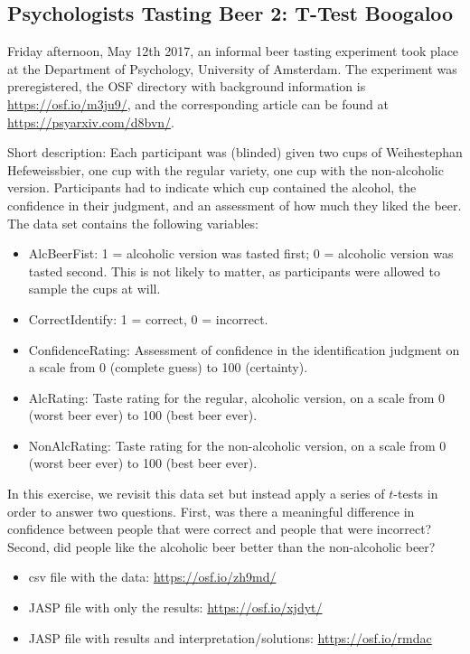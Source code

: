 \documentclass[
]{book}
\providecommand{\tightlist}{%
  \setlength{\itemsep}{0pt}\setlength{\parskip}{0pt}}
\begin{document}
\hypertarget{psychologists-tasting-beer-2-t-test-boogaloo}{%
\subsection{Psychologists Tasting Beer 2: T-Test Boogaloo}\label{psychologists-tasting-beer-2-t-test-boogaloo}}

Friday afternoon, May 12th 2017, an informal beer tasting experiment took place at the Department of Psychology, University of Amsterdam. The experiment was preregistered, the OSF directory with background information is \url{https://osf.io/m3ju9/}, and the corresponding article can be found at \url{https://psyarxiv.com/d8bvn/}.

Short description: Each participant was (blinded) given two cups of Weihestephan Hefeweissbier, one cup with the regular variety, one cup with the non-alcoholic version. Participants had to indicate which cup contained the alcohol, the confidence in their judgment, and an assessment of how much they liked the beer. The data set contains the following variables:

\begin{itemize}
\tightlist
\item
  AlcBeerFist: 1 = alcoholic version was tasted first; 0 = alcoholic version was tasted second. This is not likely to matter, as participants were allowed to sample the cups at will.
\item
  CorrectIdentify: 1 = correct, 0 = incorrect.
\item
  ConfidenceRating: Assessment of confidence in the identification judgment on a scale from 0 (complete guess) to 100 (certainty).
\item
  AlcRating: Taste rating for the regular, alcoholic version, on a scale from 0 (worst beer ever) to 100 (best beer ever).
\item
  NonAlcRating: Taste rating for the non-alcoholic version, on a scale from 0 (worst beer ever) to 100 (best beer ever).
\end{itemize}

In this exercise, we revisit this data set but instead apply a series of \(t\)-tests in order to answer two questions. First, was there a meaningful difference in confidence between people that were correct and people that were incorrect? Second, did people like the alcoholic beer better than the non-alcoholic beer?

\begin{itemize}
\tightlist
\item
  csv file with the data: \url{https://osf.io/zh9md/}
\item
  JASP file with only the results: \url{https://osf.io/xjdyt/}
\item
  JASP file with results and interpretation/solutions: \url{https://osf.io/rmdac}
\end{itemize}
\end{document}

